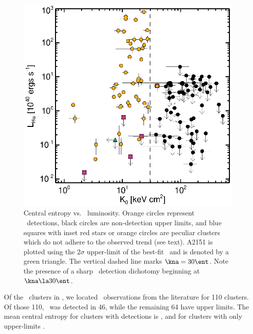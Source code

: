 \documentclass{emulateapj}
\begin{document}
\begin{figure}
 \begin{center}
    \includegraphics*[width=\columnwidth, trim=28mm 7mm 40mm 17mm, clip]{ha}
    \caption{Central entropy vs. \halpha\ luminosity. Orange circles
      represent \halpha\ detections, black circles are non-detection
      upper limits, and blue squares with inset red stars or orange
      circles are peculiar clusters which do not adhere to the
      observed trend (see text). A2151 is plotted using the 2$\sigma$
      upper-limit of the best-fit \kna\ and is denoted by a green
      triangle. The vertical dashed line marks $\kna = 30 \ent$. Note
      the presence of a sharp \halpha\ detection dichotomy beginning
      at $\kna \la 30 \ent$.}
    \label{fig:ha}
  \end{center}
\end{figure}

Of the \clnum\ clusters in \accept, we located \halpha\ observations
from the literature for 110 clusters. Of those 110, \halpha\ was
detected in 46, while the remaining 64 have upper limits. The mean
central entropy for clusters with detections is \fha, and for clusters
with only upper-limits \nfha.
\end{document}
